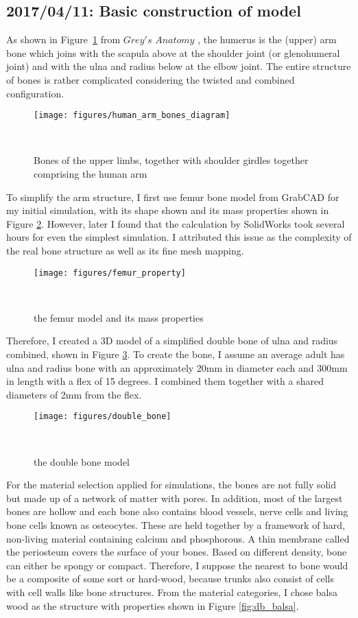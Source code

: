 \documentclass{sigchi}
\begin{document}
\subsection{2017/04/11: Basic construction of model}

As shown in Figure~\ref{fig:arm_diagram} from $Grey's$ $Anatomy$ \cite{WikipediaEN:Arm}, the humerus is the (upper) arm bone which joins with the scapula above at the shoulder joint (or glenohumeral joint) and with the ulna and radius below at the elbow joint. The entire structure of bones is rather complicated considering the twisted and combined configuration.


\begin{figure}
\centering
  \texttt{[image: figures/human\_arm\_bones\_diagram]}
  \caption{Bones of the upper limbs, together with shoulder girdles together comprising the human arm}~\label{fig:arm_diagram}
\end{figure}


To simplify the arm structure, I first use femur bone model from GrabCAD \cite{SB:bone} for my initial simulation, with its shape shown and its mass properties shown in Figure \ref{fig:femur_property}. However, later I found that the calculation by SolidWorks took several hours for even the simplest simulation. I attributed this issue as the complexity of the real bone structure as well as its fine mesh mapping. 


\begin{figure}
\centering
  \texttt{[image: figures/femur\_property]}
  \caption{the femur model and its mass properties }~\label{fig:femur_property}
\end{figure}


Therefore, I created a 3D model of a simplified double bone of ulna and radius combined, shown in Figure \ref{fig:double_bone}. To create the bone, I assume an average adult has ulna and radius bone with an approximately 20mm in diameter each and 300mm in length with a flex of 15 degrees. I combined them together with a shared diameters of 2mm from the flex. 


\begin{figure}
\centering
  \texttt{[image: figures/double\_bone]}
  \caption{the double bone model}~\label{fig:double_bone}
\end{figure}


For the material selection applied for simulations, the bones are not fully solid but made up of a network of matter with pores. In addition, most of the largest bones are hollow and each bone also contains blood vessels, nerve cells and living bone cells known as osteocytes. These are held together by a framework of hard, non-living material containing calcium and phosphorous. A thin membrane called the periosteum covers the surface of your bones. Based on different density, bone can either be spongy or compact. Therefore, I suppose the nearest to bone would be a composite of some sort or hard-wood, because trunks also consist of cells with cell walls like bone structures. From the material categories, I chose balsa wood as the structure with properties shown in Figure \ref{fig:db_balsa}.
\end{document}
